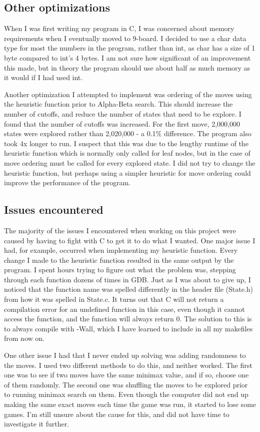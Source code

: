 \documentclass{article}
\begin{document}
\subsection{Other optimizations}
When I was first writing my program in C, I was concerned about memory requirements when I eventually moved to 9-board. I decided to use a char data type for most the numbers in the program, rather than int, as char has a size of 1 byte compared to int's 4 bytes. I am not sure how significant of an improvement this made, but in theory the program should use about half as much memory as it would if I had used int.

Another optimization I attempted to implement was ordering of the moves using the heuristic function prior to Alpha-Beta search. This should increase the number of cutoffs, and reduce the number of states that need to be explore. I found that the number of cutoffs was increased. For the first move, 2,000,000 states were explored rather than 2,020,000 - a 0.1\% difference. The program also took 4x longer to run. I suspect that this was due to the lengthy runtime of the heuristic function which is normally only called for leaf nodes, but in the case of move ordering must be called for every explored state. I did not try to change the heuristic function, but perhaps using a simpler heuristic for move ordering could improve the performance of the program.
\subsection{Issues encountered}
The majority of the issues I encountered when working on this project were caused by having to fight with C to get it to do what I wanted. One major issue I had, for example, occurred when implementing my heuristic function. Every change I made to the heuristic function resulted in the same output by the program. I spent hours trying to figure out what the problem was, stepping through each function dozens of times in GDB. Just as I was about to give up, I noticed that the function name was spelled differently in the header file (State.h) from how it was spelled in State.c. It turns out that C will not return a compilation error for an undefined function in this case, even though it cannot access the function, and the function will always return 0. The solution to this is to always compile with -Wall, which I have learned to include in all my makefiles from now on.

One other issue I had that I never ended up solving was adding randomness to the moves. I used two different methods to do this, and neither worked. The first one was to see if two moves have the same minimax value, and if so, choose one of them randomly. The second one was shuffling the moves to be explored prior to running minimax search on them. Even though the computer did not end up making the same exact moves each time the game was run, it started to lose some games. I'm still unsure about the cause for this, and did not have time to investigate it further.
\end{document}
